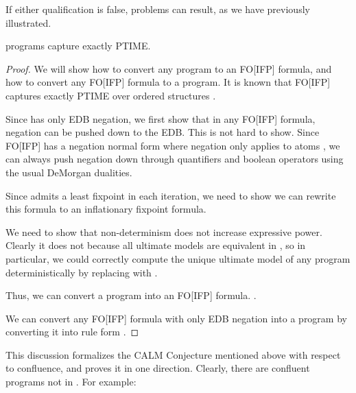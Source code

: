 If either qualification is false, problems can result, as we have previously illustrated.

\begin{theorem}
\slang programs capture exactly PTIME.
\end{theorem}
\begin{proof}
We will show how to convert any \slang program to an FO[IFP] formula, and how to convert any FO[IFP] formula to a \slang program.  It is known that FO[IFP] captures exactly PTIME over ordered structures .

Since \slang has only EDB negation, we first show that in any FO[IFP] formula, negation can be pushed down to the EDB.  This is not hard to show.  Since FO[IFP] has a negation normal form where negation only applies to atoms , we can always push negation down through quantifiers and boolean operators using the usual DeMorgan dualities.  

Since \slang admits a least fixpoint in each iteration, we need to show we can rewrite this formula to an inflationary fixpoint formula.  

We need to show that non-determinism does not increase expressive power.  Clearly it does not because all ultimate models are equivalent in \slang, so in particular, we could correctly compute the unique ultimate model of any \slang program deterministically by replacing  with .

Thus, we can convert a \slang program into an FO[IFP] formula. .

We can convert any FO[IFP] formula with only EDB negation into a \slang program by converting it into rule form .
\end{proof}



This discussion formalizes the CALM Conjecture mentioned above with respect to confluence, and proves it in one direction.
Clearly, there are confluent programs not in \slang.  For example:

